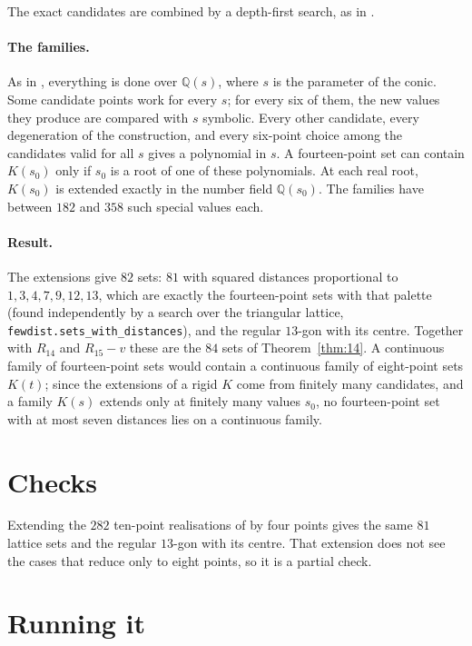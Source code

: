 \documentclass[11pt]{amsart}
\theoremstyle{remark}
\newcommand{\Q}{\mathbb{Q}}
\begin{document}
The exact candidates are combined by a depth-first search, as in \cite[Section~8]{AC}.

\paragraph{The families.} As in \cite[Section~8]{AC}, everything is done over $\Q(s)$, where $s$ is the
parameter of the conic. Some candidate points work for every $s$; for every six of them, the new values
they produce are compared with $s$ symbolic. Every other candidate, every degeneration of the construction,
and every six-point choice among the candidates valid for all $s$ gives a polynomial in $s$. A
fourteen-point set can contain $K(s_0)$ only if $s_0$ is a root of one of these polynomials. At each real
root, $K(s_0)$ is extended exactly in the number field $\Q(s_0)$. The families have between $182$ and $358$
such special values each.

\paragraph{Result.} The extensions give $82$ sets: $81$ with squared distances proportional to
$1,3,4,7,9,12,13$, which are exactly the fourteen-point sets with that palette (found independently by
a search over the triangular lattice, \texttt{fewdist.sets\_with\_distances}), and the regular $13$-gon with
its centre. Together with $R_{14}$ and $R_{15}-v$ these are the $84$ sets of Theorem~\ref{thm:14}. A continuous family of
fourteen-point sets would contain a continuous family of eight-point sets $K(t)$; since the extensions of a
rigid $K$ come from finitely many candidates, and a family $K(s)$ extends only at finitely many values
$s_0$, no fourteen-point set with at most seven distances lies on a continuous family.

\section{Checks}

Extending the $282$ ten-point realisations of \cite[Section~4]{AC} by four points gives the same $81$
lattice sets and the regular $13$-gon with its centre. That extension does not see the cases that reduce
only to eight points, so it is a partial check.

\section{Running it}
\end{document}
